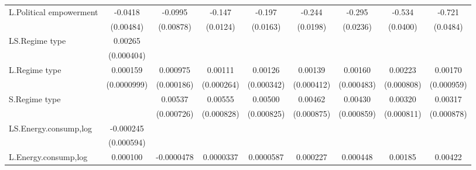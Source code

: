 \begin{table}[htbp]
\begin{tabular}{l*{8}{c}}
L.Political empowerment&     -0.0418\sym{***}&     -0.0995\sym{***}&      -0.147\sym{***}&      -0.197\sym{***}&      -0.244\sym{***}&      -0.295\sym{***}&      -0.534\sym{***}&      -0.721\sym{***}\\
                    &   (0.00484)         &   (0.00878)         &    (0.0124)         &    (0.0163)         &    (0.0198)         &    (0.0236)         &    (0.0400)         &    (0.0484)         \\
[1em]
LS.Regime type      &     0.00265\sym{***}&                     &                     &                     &                     &                     &                     &                     \\
                    &  (0.000404)         &                     &                     &                     &                     &                     &                     &                     \\
[1em]
L.Regime type       &    0.000159         &    0.000975\sym{***}&     0.00111\sym{***}&     0.00126\sym{***}&     0.00139\sym{***}&     0.00160\sym{***}&     0.00223\sym{***}&     0.00170\sym{*}  \\
                    & (0.0000999)         &  (0.000186)         &  (0.000264)         &  (0.000342)         &  (0.000412)         &  (0.000483)         &  (0.000808)         &  (0.000959)         \\
[1em]
S.Regime type       &                     &     0.00537\sym{***}&     0.00555\sym{***}&     0.00500\sym{***}&     0.00462\sym{***}&     0.00430\sym{***}&     0.00320\sym{***}&     0.00317\sym{***}\\
                    &                     &  (0.000726)         &  (0.000828)         &  (0.000825)         &  (0.000875)         &  (0.000859)         &  (0.000811)         &  (0.000878)         \\
[1em]
LS.Energy.consump,log&   -0.000245         &                     &                     &                     &                     &                     &                     &                     \\
                    &  (0.000594)         &                     &                     &                     &                     &                     &                     &                     \\
[1em]
L.Energy.consump,log&    0.000100         &  -0.0000478         &   0.0000337         &   0.0000587         &    0.000227         &    0.000448         &     0.00185         &     0.00422         \\

\end{tabular}
\end{table}
